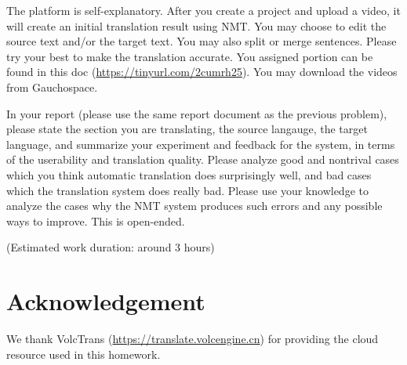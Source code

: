 \documentclass[12pt,letterpaper]{article}
\begin{document}
The platform is self-explanatory. After you create a project and upload a video, it will create an initial translation result using NMT. You may choose to edit the source text and/or the target text. You may also split or merge sentences. 
Please try your best to make the translation accurate. You assigned portion can be found in this doc (\url{https://tinyurl.com/2cumrh25}). You may download the videos from Gauchospace. 

In your report (please use the same report document as the previous problem), please state the section you are translating, the source langauge, the target language, and summarize your experiment and feedback for the system, in terms of the userability and translation quality. Please analyze good and nontrival cases which you think automatic translation does surprisingly well, and bad cases which the translation system does really bad. 
Please use your knowledge to analyze the cases why the NMT system produces such errors and any possible ways to improve. This is open-ended. 

(Estimated work duration: around 3 hours)

\section*{Acknowledgement}
We thank VolcTrans (\url{https://translate.volcengine.cn}) for providing the cloud resource used in this homework. 
\end{document}
